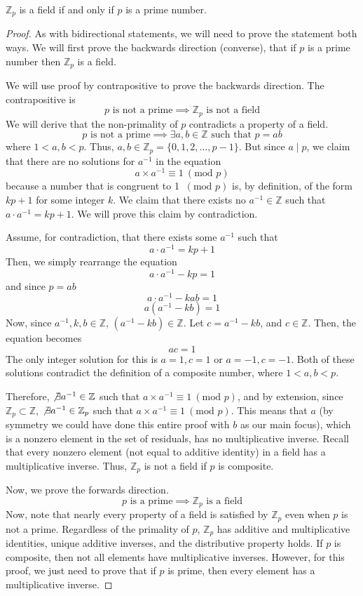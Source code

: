 \begin{lemma}
$\mathbb{Z}_p$ is a field if and only if $p$ is a prime number.
\end{lemma}
\begin{proof}
As with bidirectional statements, we will need to prove the statement both ways. We will first prove the backwards direction (converse), that if $p$ is a prime number then $\mathbb{Z}_p$ is a field.

We will use proof by contrapositive to prove the backwards direction. The contrapositive is 
\[
\text{$p$ is not a prime} \implies \text{$\mathbb{Z}_p$ is not a field}
\]
We will derive that the non-primality of $p$ contradicts a property of a field.
\[
\text{$p$ is not a prime} \implies \exists a, b \in \mathbb{Z} \text{ such that } p = ab
\]
where $1 < a, b < p$. Thus, $a, b \in \mathbb{Z}_p = \{0, 1, 2,  \ldots, p-1 \}$. But since $a \mid p$, we claim that there are no solutions for $a^{-1}$ in the equation
\[
a \times a^{-1} \equiv 1 ~(\text{mod }p)
\]
because a number that is congruent to 1 $~(\text{mod }p)$ is, by definition, of the form $kp + 1$ for some integer $k$. We claim that there exists no $a^{-1} \in \mathbb{Z}$ such that $a \cdot a^{-1} = kp + 1$. We will prove this claim by contradiction. 

Assume, for contradiction, that there exists some $a^{-1}$ such that 
\[
a \cdot a^{-1} = kp + 1
\]
Then, we simply rearrange the equation
\[
a \cdot a^{-1} -kp = 1
\]
and since $p = ab$
\[
a \cdot a^{-1} -kab = 1
\]
\[
a(a^{-1} -kb) = 1
\]
Now, since $a^{-1}, k, b \in \mathbb{Z}$, $(a^{-1} -kb) \in \mathbb{Z}$. Let $c = a^{-1} -kb$, and $c \in \mathbb{Z}$. Then, the equation becomes
\[
ac = 1
\]
The only integer solution for this is $a = 1, c = 1$ or $a = -1, c = -1$. Both of these solutions contradict the definition of a composite number, where $1 < a, b < p$.

Therefore, $\not\exists a^{-1} \in \mathbb{Z}$ such that $a \times a^{-1} \equiv 1 ~(\text{mod }p)$, and by extension, since $\mathbb{Z}_p \subset \mathbb{Z}$, $\not\exists a^{-1} \in \mathbb{Z}_p$ such that $a \times a^{-1} \equiv 1 ~(\text{mod }p)$. This means that $a$ (by symmetry we could have done this entire proof with $b$ as our main focus), which is a nonzero element in the set of residuals, has no multiplicative inverse. Recall that every nonzero element (not equal to additive identity) in a field has a multiplicative inverse. Thus, $\mathbb{Z}_p$ is not a field if $p$ is composite.

Now, we prove the forwards direction. 
\[
\text{$p$ is a prime} \implies \text{$\mathbb{Z}_p$ is a field}
\]
Now, note that nearly every property of a field is satisfied by $\mathbb{Z}_p$ even when $p$ is not a prime. Regardless of the primality of $p$, $\mathbb{Z}_p$ has additive and multiplicative identities, unique additive inverses, and the distributive property holds. If $p$ is composite, then not all elements have multiplicative inverses. However, for this proof, we just need to prove that if $p$ is prime, then every element has a multiplicative inverse. 


\end{proof}
